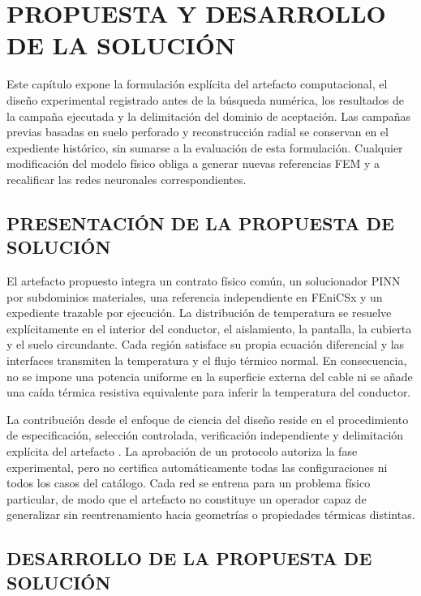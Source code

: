 \chapter{PROPUESTA Y DESARROLLO DE LA SOLUCIÓN}
\label{ch:propuesta-desarrollo}
\thispagestyle{empty}

Este capítulo expone la formulación explícita del artefacto computacional, el diseño experimental registrado antes de la búsqueda numérica, los resultados de la campaña ejecutada y la delimitación del dominio de aceptación. Las campañas previas basadas en suelo perforado y reconstrucción radial se conservan en el expediente histórico, sin sumarse a la evaluación de esta formulación. Cualquier modificación del modelo físico obliga a generar nuevas referencias FEM y a recalificar las redes neuronales correspondientes.

\section{PRESENTACIÓN DE LA PROPUESTA DE SOLUCIÓN}
\label{sec:presentacion-propuesta}

El artefacto propuesto integra un contrato físico común, un solucionador PINN por subdominios materiales, una referencia independiente en FEniCSx y un expediente trazable por ejecución. La distribución de temperatura se resuelve explícitamente en el interior del conductor, el aislamiento, la pantalla, la cubierta y el suelo circundante. Cada región satisface su propia ecuación diferencial y las interfaces transmiten la temperatura y el flujo térmico normal. En consecuencia, no se impone una potencia uniforme en la superficie externa del cable ni se añade una caída térmica resistiva equivalente para inferir la temperatura del conductor.

La contribución desde el enfoque de ciencia del diseño reside en el procedimiento de especificación, selección controlada, verificación independiente y delimitación explícita del artefacto \parencites{peffers2007}{gregor2013}. La aprobación de un protocolo autoriza la fase experimental, pero no certifica automáticamente todas las configuraciones ni todos los casos del catálogo. Cada red se entrena para un problema físico particular, de modo que el artefacto no constituye un operador capaz de generalizar sin reentrenamiento hacia geometrías o propiedades térmicas distintas.

\section{DESARROLLO DE LA PROPUESTA DE SOLUCIÓN}
\label{sec:desarrollo-solucion}

